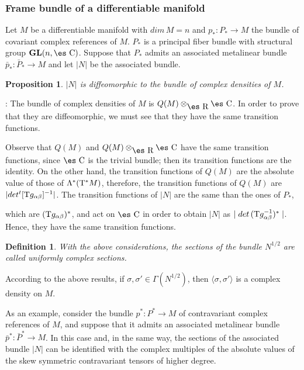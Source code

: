 \documentclass[12pt]{article}
\theoremstyle{plain}
\newtheorem{prop}{Proposition}
\newtheorem{definition}{Definition}
\def\qed{\ifvmode\removelastskip\fi
{\unskip\nobreak\hfil\penalty50\hbox{}\nobreak\hfil
\hbox{\vrule height1.2ex width1.2ex}\parfillskip=0pt
\finalhyphendemerits=0 \par\smallskip}}
\def\GL{{\bf GL}(n,\Complex )}
\def\Real{\mbox{\es R}}
\def\Complex{\mbox{\es C}}
\def\Tan{{\rm T}}
\begin{document}
\subsubsection{Frame bundle of a differentiable manifold}


Let $M$ be a differentiable manifold with $dim\, M = n$ and
$p_* \colon P_* \to M$ the bundle of covariant complex references of
$M$.
$P_*$ is a principal fiber bundle with structural group $\GL$.
Suppose that $P_*$ admits an associated metalinear bundle
$\bar p_* \colon \bar P_* \to M$ and let $| N |$ be the associated
bundle.

\begin{prop}
$| N |$ is diffeomorphic to the bundle of complex densities of $M$.
\end{prop}
: 
The bundle of complex densities  of $M$ is $Q(M) \otimes_{\Real}
\Complex$.
In order to prove that they are diffeomorphic, we must see that they
have the
same transition functions.

Observe that $Q(M)$ and $Q(M) \otimes_{\Real} \Complex$
have the same transition functions, since $\Complex$ is the trivial
bundle;
then its transition functions are the identity.
On the other hand, the transition functions of $Q(M)$
are the absolute value of those of $\Lambda^*(\Tan^*M)$,
therefore, the transition functions of $Q(M)$ are $| det ^t[\Tan
g_{\alpha \beta }]^{-1} |$.
The transition functions of $| N |$ are the same than the ones of $P_*$,

which are $(\Tan g_{\alpha \beta })^*$,
and act on $\Complex$ in order to obtain $| N |$ as
$\mid det\, (\Tan g_{\alpha \beta }^{-1})^*\mid$. Hence, they have the
same transition functions.
\qed

\begin{definition}
With the above considerations, the sections of the bundle $N^{1/2}$
are called {\rm uniformly complex sections}.
\end{definition}

According to the above results, if $\sigma , \sigma '\in \Gamma
(N^{1/2})$,
then $\langle \sigma ,\sigma ' \rangle$ is a complex density on $M$.

As an example, consider the bundle $p^* \colon P^* \to M$
of contravariant complex references of $M$,
and suppose that it admits an associated metalinear bundle
$\bar p^* \colon \bar P^* \to M$. In this case and,
in the same way, the sections of the associated bundle
$| N |$ can be identified with the complex multiples
of the absolute values of the skew symmetric contravariant tensors of
higher degree.
\end{document}
